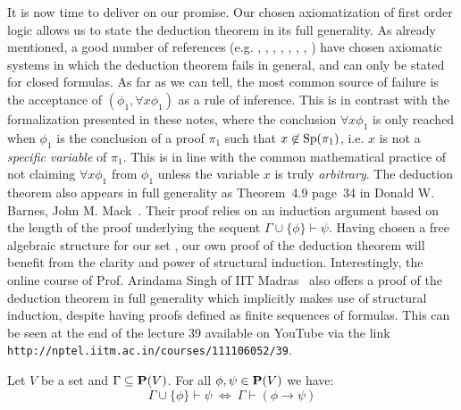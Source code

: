 It is now time to deliver on our promise. Our chosen axiomatization
of first order logic allows us to state the deduction theorem in its
full generality. As already mentioned, a good number of references
(e.g. \cite{Ferenczi}, \cite{Hoyois}, \cite{Johnstone},
\cite{Kunen}, \cite{Mendelson}, \cite{Monk}, \cite{Metamath},
\cite{Tourlakis}) have chosen axiomatic systems in which the
deduction theorem fails in general, and can only be stated for
closed formulas. As far as we can tell, the most common source of
failure is the acceptance of $(\phi_{1},\forall x\phi_{1})$ as a
rule of inference. This is in contrast with the formalization
presented in these notes, where the conclusion $\forall x\phi_{1}$
is only reached when $\phi_{1}$ is the conclusion of a proof
$\pi_{1}$ such that $x\not\in\mbox{\rm Sp}(\pi_{1})$, i.e. $x$ is not a {\em
specific variable} of $\pi_{1}$. This is in line with the common
mathematical practice of not claiming $\forall x\phi_{1}$ from
$\phi_{1}$ unless the variable $x$ is truly {\em arbitrary}. The
deduction theorem also appears in full generality as Theorem~4.9
page~34 in Donald W. Barnes, John M. Mack~\cite{AlgLog}. Their proof
relies on an induction argument based on the length of the proof
underlying the sequent $\Gamma\cup\{\phi\}\vdash\psi$. Having chosen
a free algebraic structure for our set \pvs, our own proof of the
deduction theorem will benefit from the clarity and power of
structural induction. Interestingly, the online course of Prof.
Arindama Singh of IIT Madras~\cite{Singh} also offers a proof of the
deduction theorem in full generality which implicitly makes use of
structural induction, despite having proofs defined as finite
sequences of formulas. This can be seen at the end of the lecture 39
available on YouTube via the link
\texttt{http://nptel.iitm.ac.in/courses/111106052/39}.
\begin{theorem}\label{logic:the:FOPL:deduction}
Let $V$ be a set and $\Gamma\subseteq\mbox{${\bf P}(V)$}$. For all $\phi,\psi\in\mbox{${\bf P}(V)$}$
we have:
    \[
    \Gamma\cup\{\phi\}\vdash\psi\ \Leftrightarrow\ \Gamma\vdash
    (\phi\to\psi)
    \]
\end{theorem}
